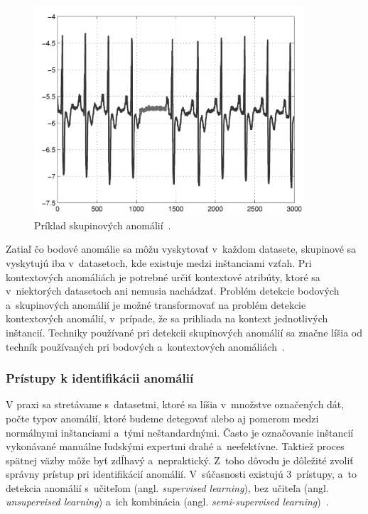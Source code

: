 \documentclass[a4paper,twoside,slovak,12pt,appendix]{article}
\begin{document}
\begin{figure}[H]
  \centering
  \includegraphics[width=0.9\textwidth]{collective_anomalies.png}
  \caption{Príklad skupinových anomálií~\cite{Chandola2009}.}
  \label{fig:collective-anomalies}
\end{figure}

Zatiaľ čo bodové anomálie sa môžu vyskytovať v~každom datasete, skupinové sa
vyskytujú iba v~datasetoch, kde existuje medzi inštanciami vzťah. Pri
kontextových anomáliách je potrebné určiť kontextové atribúty, ktoré sa
v~niektorých datasetoch ani nemusia nachádzať. Problém detekcie bodových
a~skupinových anomálií je možné transformovať na problém detekcie kontextových
anomálií, v~prípade, že sa prihliada na kontext jednotlivých inštancií. Techniky
používané pri detekcii skupinových anomálií sa značne líšia od techník
používaných pri bodových a~kontextových anomáliách~\cite{Chandola2009}.


\subsubsection{Prístupy k identifikácii anomálií}
V praxi sa stretávame s~datasetmi, ktoré sa líšia v~množstve označených dát,
počte typov anomálií, ktoré budeme detegovať alebo aj pomerom medzi normálnymi
inštanciami a~tými neštandardnými. Často je označovanie inštancií vykonávané
manuálne ľudskými expertmi drahé a~neefektívne. Taktiež proces spätnej väzby
môže byť zdĺhavý a~nepraktický. Z~toho dôvodu je dôležité zvoliť správny
prístup pri identifikácií anomálií. V~súčasnosti existujú 3~prístupy, a~to
detekcia anomálií s~učiteľom (angl. \textit{supervised learning}), bez učiteľa
(angl. \textit{unsupervised learning}) a~ich kombinácia (angl.
\textit{semi-supervised learning})~\cite{Chandola2009}.
\end{document}
